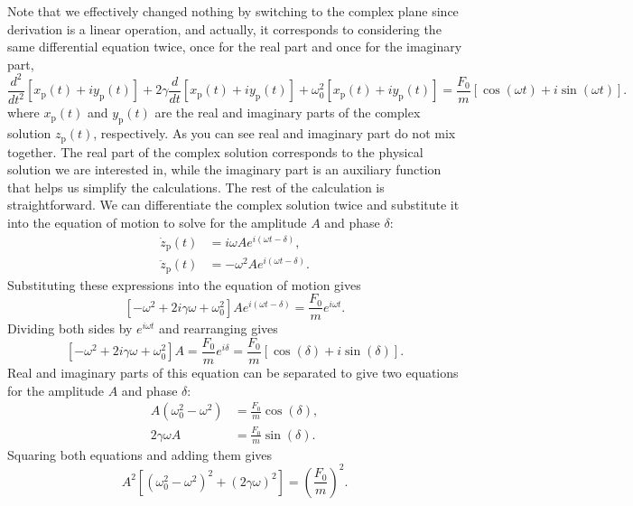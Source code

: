 \documentclass[12pt]{article}
\begin{document}
Note that we effectively changed nothing by switching to the complex plane since derivation is a linear operation, and actually, it corresponds to considering the same differential equation twice, once for the real part and once for the imaginary part,
\begin{equation}
    \frac{d^2}{dt^2}\left[x_\text{p}(t)+iy_\text{p}(t)\right]
    +2\gamma\frac{d}{dt}\left[x_\text{p}(t)+iy_\text{p}(t)\right]
    +\omega_0^2\left[x_\text{p}(t)+iy_\text{p}(t)\right]
    =\frac{F_0}{m}\left[\cos(\omega t)+i\sin(\omega t)\right].
\end{equation}
where $x_\text{p}(t)$ and $y_\text{p}(t)$ are the real and imaginary parts of the complex solution $z_\text{p}(t)$, respectively. As you can see real and imaginary part do not mix together. The real part of the complex solution corresponds to the physical solution we are interested in, while the imaginary part is an auxiliary function that helps us simplify the calculations. The rest of the calculation is straightforward. We can differentiate the complex solution twice and substitute it into the equation of motion to solve for the amplitude $A$ and phase $\delta$:
\begin{align}
    \dot{z}_\text{p}(t) &= i\omega Ae^{i(\omega t-\delta)},\\
    \ddot{z}_\text{p}(t) &= -\omega^2 Ae^{i(\omega t-\delta)}.
\end{align}
Substituting these expressions into the equation of motion gives
\begin{equation}
    \left[-\omega^2+2i\gamma\omega+\omega_0^2\right]Ae^{i(\omega t-\delta)}=\frac{F_0}{m}e^{i\omega t}.
\end{equation}
Dividing both sides by $e^{i\omega t}$ and rearranging gives
\begin{equation}
    \left[-\omega^2+2i\gamma\omega+\omega_0^2\right]A=\frac{F_0}{m}e^{i\delta}=\frac{F_0}{m}\left[\cos(\delta)+i\sin(\delta)\right].
\end{equation}
Real and imaginary parts of this equation can be separated to give two equations for the amplitude $A$ and phase $\delta$:
\begin{align}
    A\left(\omega_0^2-\omega^2\right) &= \frac{F_0}{m}\cos(\delta),\\
    2\gamma\omega A &= \frac{F_0}{m}\sin(\delta).
\end{align}
Squaring both equations and adding them gives
\begin{equation}
    A^2\left[\left(\omega_0^2-\omega^2\right)^2+(2\gamma\omega)^2\right]=\left(\frac{F_0}{m}\right)^2.
\end{equation}
\end{document}
